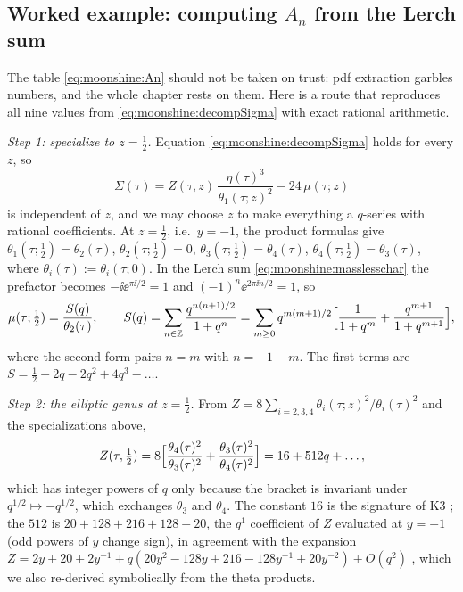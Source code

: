 \subsection{Worked example: computing \texorpdfstring{$A_n$}{A\_n} from the Lerch sum}
\label{sec:moonshine:worked1}

The table \eqref{eq:moonshine:An} should not be taken on trust: pdf extraction garbles
numbers, and the whole chapter rests on them. Here is a route that reproduces all nine
values from \eqref{eq:moonshine:decompSigma} with exact rational arithmetic.

\emph{Step 1: specialize to $z=\tfrac12$.} Equation \eqref{eq:moonshine:decompSigma} holds
for every $z$, so
\begin{equation}\label{eq:moonshine:Sigmaformula}
  \Sigma(\tau)=Z(\tau,z)\,\frac{\eta(\tau)^3}{\theta_1(\tau;z)^2}-24\,\mu(\tau;z)
\end{equation}
is independent of $z$, and we may choose $z$ to make everything a $q$-series with rational
coefficients. At $z=\tfrac12$, i.e.\ $y=-1$, the product formulas
 give
$\theta_1(\tau;\tfrac12)=\theta_2(\tau)$, $\theta_2(\tau;\tfrac12)=0$,
$\theta_3(\tau;\tfrac12)=\theta_4(\tau)$, $\theta_4(\tau;\tfrac12)=\theta_3(\tau)$, where
$\theta_i(\tau):=\theta_i(\tau;0)$. In the Lerch sum \eqref{eq:moonshine:masslesschar} the
prefactor becomes $-\ii\ee^{\pi\ii/2}=1$ and $(-1)^n\ee^{2\pi\ii n/2}=1$, so
\begin{equation}\label{eq:moonshine:S}
  \mu(\tau;\tfrac12)=\frac{S(q)}{\theta_2(\tau)},\qquad
  S(q)=\sum_{n\in\mathbb{Z}}\frac{q^{n(n+1)/2}}{1+q^n}
  =\sum_{m\ge0}q^{m(m+1)/2}\Bigl[\frac1{1+q^m}+\frac{q^{m+1}}{1+q^{m+1}}\Bigr],
\end{equation}
where the second form pairs $n=m$ with $n=-1-m$. The first terms are
$S=\tfrac12+2q-2q^2+4q^3-\dots$.

\emph{Step 2: the elliptic genus at $z=\tfrac12$.} From
$Z=8\sum_{i=2,3,4}\theta_i(\tau;z)^2/\theta_i(\tau)^2$ 
and the specializations above,
\begin{equation}\label{eq:moonshine:Zhalf}
  Z(\tau,\tfrac12)=8\Bigl[\frac{\theta_4(\tau)^2}{\theta_3(\tau)^2}
  +\frac{\theta_3(\tau)^2}{\theta_4(\tau)^2}\Bigr]=16+512q+\dots,
\end{equation}
which has integer powers of $q$ only because the bracket is invariant under
$q^{1/2}\mapsto-q^{1/2}$, which exchanges $\theta_3$ and $\theta_4$. The constant $16$ is the
signature of K3 ; the $512$ is $20+128+216+128+20$, the
$q^1$ coefficient of $Z$ evaluated at $y=-1$ (odd powers of $y$ change sign), in agreement
with the expansion $Z=2y+20+2y^{-1}+q(20y^2-128y+216-128y^{-1}+20y^{-2})+O(q^2)$
, which we also re-derived symbolically from the theta
products.

